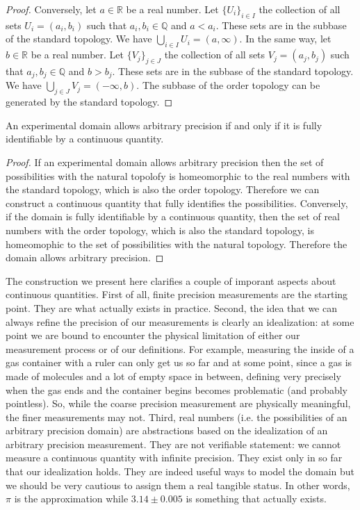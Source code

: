 \documentclass[11pt,letterpaper,fleqn]{memoir} %
\begin{document}
\begin{mathSection}
\begin{proof}
		Conversely, let $a \in \mathbb{R}$ be a real number. Let $\{U_i\}_{i \in I}$ the collection of all sets $U_i = (a_i, b_i)$ such that $a_i, b_i \in \mathbb{Q}$ and $a < a_i$. These sets are in the subbase of the standard topology. We have $\bigcup\limits_{i \in I} U_i = (a, \infty)$. In the same way, let $b \in \mathbb{R}$ be a real number. Let $\{V_j\}_{j \in J}$ the collection of all sets $V_j = (a_j, b_j)$ such that $a_j, b_j \in \mathbb{Q}$ and $b > b_j$. These sets are in the subbase of the standard topology. We have $\bigcup\limits_{j \in J} V_j = (-\infty, b)$. The subbase of the order topology can be generated by the standard topology.
	\end{proof}
	
	\begin{prop}
		An experimental domain allows arbitrary precision if and only if it is fully identifiable by a continuous quantity.
	\end{prop}

	\begin{proof}
		If an experimental domain allows arbitrary precision then the set of possibilities with the natural topolofy is homeomorphic to the real numbers with the standard topology, which is also the order topology. Therefore we can construct a continuous quantity that fully identifies the possibilities. Conversely, if the domain is fully identifiable by a continuous quantity, then the set of real numbers with the order topology, which is also the standard topology, is homeomophic to the set of possibilities with the natural topology. Therefore the domain allows arbitrary precision.
	\end{proof}	
\end{mathSection}

The construction we present here clarifies a couple of imporant aspects about continuous quantities. First of all, finite precision measurements are the starting point. They are what actually exists in practice. Second, the idea that we can always refine the precision of our measurements is clearly an idealization: at some point we are bound to encounter the physical limitation of either our measurement process or of our definitions. For example, measuring the inside of a gas container with a ruler can only get us so far and at some point, since a gas is made of molecules and a lot of empty space in between, defining very precisely when the gas ends and the container begins becomes problematic (and probably pointless). So, while the coarse precision measurement are physically meaningful, the finer measurements may not. Third, real numbers (i.e. the possibilities of an arbitrary precision domain) are abstractions based on the idealization of an arbitrary precision measurement. They are not verifiable statement: we cannot measure a continuous quantity with infinite precision. They exist only in so far that our idealization holds. They are indeed useful ways to model the domain but we should be very cautious to assign them a real tangible status. In other words, $\pi$ is the approximation while $3.14 \pm 0.005$ is something that actually exists.
\end{document}
